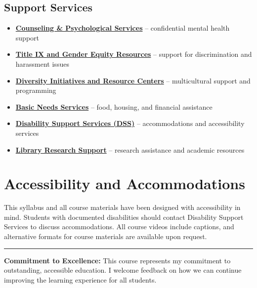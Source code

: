 \documentclass[11pt]{scrartcl} %
\begin{document}
\subsection{Support Services}
\begin{itemize}
\item \textbf{\href{https://www.fullerton.edu/caps/}{Counseling \& Psychological Services}} -- confidential mental health support
\item \textbf{\href{https://www.fullerton.edu/titleix/}{Title IX and Gender Equity Resources}} -- support for discrimination and harassment issues
\item \textbf{\href{https://www.fullerton.edu/dirc/}{Diversity Initiatives and Resource Centers}} -- multicultural support and programming
\item \textbf{\href{https://www.fullerton.edu/basicneeds/}{Basic Needs Services}} -- food, housing, and financial assistance
\item \textbf{\href{https://www.fullerton.edu/dss/}{Disability Support Services (DSS)}} -- accommodations and accessibility services
\item \textbf{\href{https://www.library.fullerton.edu/}{Library Research Support}} -- research assistance and academic resources
\end{itemize}

\section{Accessibility and Accommodations}

This syllabus and all course materials have been designed with accessibility in mind. Students with documented disabilities should contact Disability Support Services to discuss accommodations. All course videos include captions, and alternative formats for course materials are available upon request.

\vspace{1em}
\hrule
\vspace{0.5em}
\textbf{Commitment to Excellence:} This course represents my commitment to outstanding, accessible education. I welcome feedback on how we can continue improving the learning experience for all students.
\end{document}
